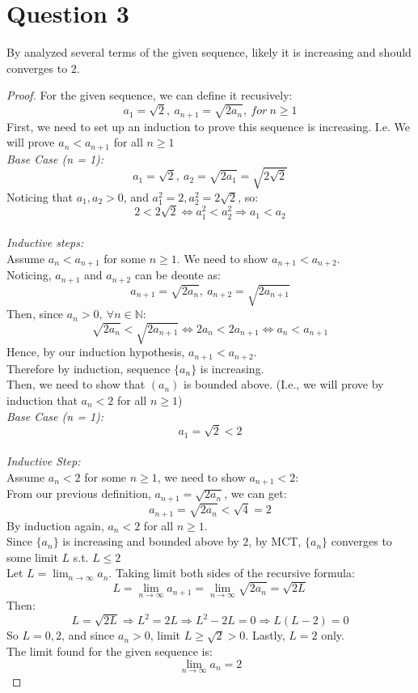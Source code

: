 \documentclass{article}
\begin{document}
\section*{Question 3}
By analyzed several terms of the given sequence, likely it is increasing and should converges to $2$.
\begin{proof}
    For the given sequence, we can define it recusively:
    \[ a_1 = \sqrt{2}, \ a_{n + 1} = \sqrt{2a_n}, \ for \ n \geq 1 \]
    First, we need to set up an induction to prove this sequence is increasing. I.e. We will prove $a_n < a_{n + 1}$ for all $n \geq 1$
    \\
    \textit{Base Case (n = 1):}
    \\
    \[ a_1 = \sqrt{2}, \ a_2 = \sqrt{2a_1} = \sqrt{2\sqrt{2}} \]
    Noticing that $a_1, a_2 > 0$, and $a_1^2 = 2, a_2^2 = 2\sqrt{2}$, so:
    \[ 2 < 2\sqrt{2} \Leftrightarrow a_1^2 < a_2^2 \Rightarrow a_1 < a_2 \]
    \\
    \textit{Inductive steps:}
    \\
    Assume $a_n < a_{n + 1}$ for some $n \geq 1$. We need to show $a_{n + 1} < a_{n + 2}$.
    \\
    Noticing, $a_{n + 1}$ and $a_{n + 2}$ can be deonte as:
    \[ a_{n + 1} = \sqrt{2a_n}, \ a_{n + 2} = \sqrt{2a_{n+1}} \]
    Then, since $a_n > 0, \ \forall n \in \mathbb{N}$:
    \[ \sqrt{2a_n} < \sqrt{2a_{n+1}} \Leftrightarrow 2a_n < 2a_{n+1} \Leftrightarrow a_n < a_{n+1} \]
    Hence, by our induction hypothesis, $a_{n + 1} < a_{n + 2}$. 
    \\
    Therefore by induction, sequence $\{a_n\}$ is increasing.
    \\
    Then, we need to show that $(a_n)$ is bounded above. (I.e., we will prove by induction that $a_n < 2$ for all $n \geq 1$)
    \\
    \textit{Base Case (n = 1):}
    \\
    \[ a_1 = \sqrt{2} < 2 \]
    \\
    \textit{Inductive Step:}
    \\
    Assume $a_n < 2$ for some $n \geq 1$, we need to show $a_{n + 1} < 2$:
    \\
    From our previous definition, $a_{n + 1} = \sqrt{2 a_n}$, we can get: 
    \[ a_{n + 1} = \sqrt{2a_n} < \sqrt{4} = 2 \]
    By induction again, $a_n < 2$ for all $n \geq 1$.
    \\
    Since $\{a_n \}$ is increasing and bounded above by $2$, by MCT, $\{a_n\}$ converges to some limit $L$ s.t. $L \leq 2$
    \\
    Let $L = \lim_{n \rightarrow \infty} a_n$. Taking limit both sides of the recursive formula:
    \[ L = \lim_{n \rightarrow \infty} a_{n + 1} = \lim_{n \rightarrow \infty} \sqrt{2a_n} = \sqrt{2L} \]
    Then:
    \[ L = \sqrt{2L} \Longrightarrow L^2 = 2L \Longrightarrow L^2 - 2L = 0 \Longrightarrow L(L - 2) = 0 \]
    So $L = 0, 2$, and since $a_n > 0$, limit $L \geq \sqrt{2} > 0$. Lastly, $L = 2$ only.
    \\
    The limit found for the given sequence is:
    \[ \lim_{n \rightarrow \infty} a_n = 2 \]
\end{proof}
\end{document}
